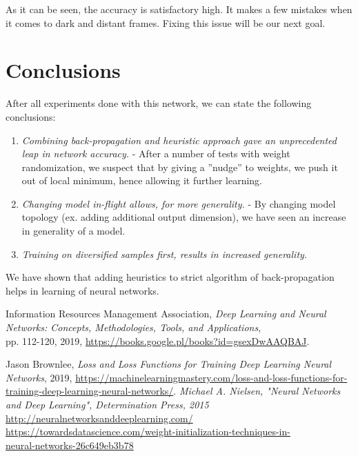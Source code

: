 \documentclass[conference]{IEEEtran}
\begin{document}
As it can be seen, the accuracy is satisfactory high. It makes a few mistakes when it comes to dark and distant frames. Fixing this issue will be our next goal.

\vspace{5pt} 
	\section{Conclusions}
	After all experiments done with this network, we can state the following conclusions:
	\begin{enumerate}
	    \item \textit{Combining back-propagation and heuristic approach gave an unprecedented leap in network accuracy.} - After a number of tests with weight randomization, we suspect that by giving a ''nudge'' to weights, we push it out of local minimum, hence allowing it further learning.
	    \item \textit{Changing model in-flight allows, for more generality.} - By changing model topology (ex. adding additional output dimension), we have seen an increase in generality of a model.
	    \item \textit{Training on diversified samples first, results in increased generality.}
	\end{enumerate}
	
	We have shown that adding heuristics to strict algorithm of back-propagation helps in learning of neural networks. 

\vspace{10pt}
\begin{thebibliography}{9}
Information Resources Management Association, 
\textit{Deep Learning and Neural Networks: Concepts, Methodologies, Tools, and Applications}, \\ pp. 112-120, 2019, \url{https://books.google.pl/books?id=gsexDwAAQBAJ}.

Jason Brownlee,
\textit{Loss and Loss Functions for Training Deep Learning Neural Networks}, 2019,
\url{https://machinelearningmastery.com/loss-and-loss-functions-for-training-deep-learning-neural-networks/}.
\textit{Michael A. Nielsen, "Neural Networks and Deep Learning", Determination Press, 2015}
\url{http://neuralnetworksanddeeplearning.com/}
\href{https://towardsdatascience.com/weight-initialization-techniques-in-neural-networks-26c649eb3b78}{https://towardsdatascience.com/weight-initialization-techniques-in- \\ neural-networks-26c649eb3b78}
\end{thebibliography}
\end{document}
